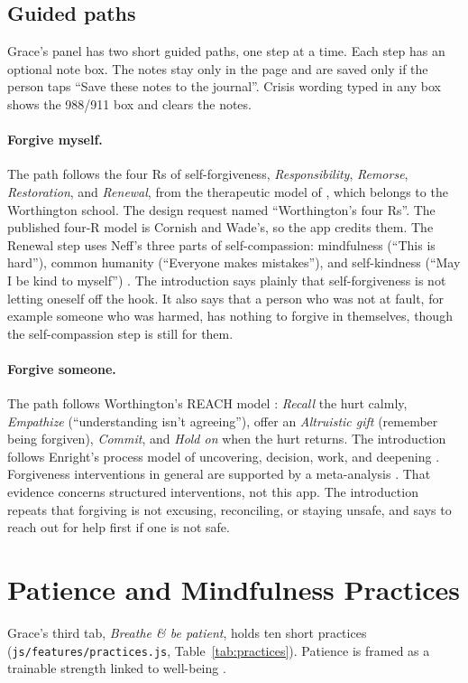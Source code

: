 \documentclass[10pt]{article}
\theoremstyle{definition}
\theoremstyle{remark}
\begin{document}
\subsection{Guided paths}
Grace's panel has two short guided paths, one step at a time. Each step has an optional note box. The notes stay only in the page and are saved only if the person taps ``Save these notes to the journal''. Crisis wording typed in any box shows the 988/911 box and clears the notes.

\paragraph{Forgive myself.} The path follows the four Rs of self-forgiveness, \emph{Responsibility}, \emph{Remorse}, \emph{Restoration}, and \emph{Renewal}, from the therapeutic model of \citet{cornish2015}, which belongs to the Worthington school. The design request named ``Worthington's four Rs''. The published four-R model is Cornish and Wade's, so the app credits them. The Renewal step uses Neff's three parts of self-compassion: mindfulness (``This is hard''), common humanity (``Everyone makes mistakes''), and self-kindness (``May I be kind to myself'') \citep{neff2003}. The introduction says plainly that self-forgiveness is not letting oneself off the hook. It also says that a person who was not at fault, for example someone who was harmed, has nothing to forgive in themselves, though the self-compassion step is still for them.

\paragraph{Forgive someone.} The path follows Worthington's REACH model \citep{worthington2006}: \emph{Recall} the hurt calmly, \emph{Empathize} (``understanding isn't agreeing''), offer an \emph{Altruistic gift} (remember being forgiven), \emph{Commit}, and \emph{Hold on} when the hurt returns. The introduction follows Enright's process model of uncovering, decision, work, and deepening \citep{enright2015}. Forgiveness interventions in general are supported by a meta-analysis \citep{wade2014}. That evidence concerns structured interventions, not this app. The introduction repeats that forgiving is not excusing, reconciling, or staying unsafe, and says to reach out for help first if one is not safe.

\section{Patience and Mindfulness Practices}
\label{sec:practices}
Grace's third tab, \emph{Breathe \& be patient}, holds ten short practices (\texttt{js/features/practices.js}, Table~\ref{tab:practices}). Patience is framed as a trainable strength linked to well-being \citep{schnitker2012}.
\end{document}
